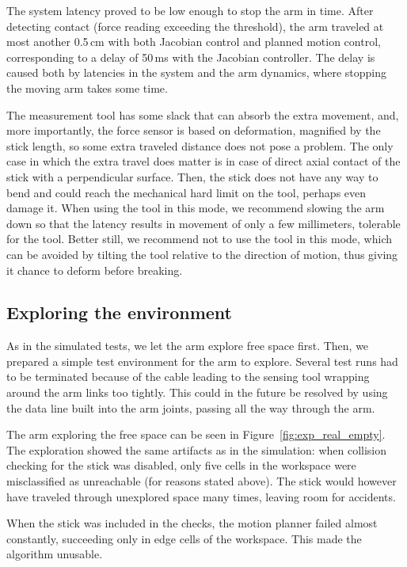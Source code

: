 \documentclass[buriama8_dp.tex]{subfiles}
\begin{document}
The system latency proved to be low enough to stop the arm in time. After detecting contact (force reading exceeding the threshold), the arm traveled at most another 0.5\,cm with both Jacobian control and planned motion control, corresponding to a delay of 50\,ms with the Jacobian controller. The delay is caused both by latencies in the system and the arm dynamics, where stopping the moving arm takes some time.

The measurement tool has some slack that can absorb the extra movement, and, more importantly, the force sensor is based on deformation, magnified by the stick length, so some extra traveled distance does not pose a problem. The only case in which the extra travel does matter is in case of direct axial contact of the stick with a perpendicular surface. Then, the stick does not have any way to bend and could reach the mechanical hard limit on the tool, perhaps even damage it. When using the tool in this mode, we recommend slowing the arm down so that the latency results in movement of only a few millimeters, tolerable for the tool. Better still, we recommend not to use the tool in this mode, which can be avoided by tilting the tool relative to the direction of motion, thus giving it chance to deform before breaking.



\subsection{Exploring the environment}
\label{subsec:expl_real}

As in the simulated tests, we let the arm explore free space first. Then, we prepared a simple test environment for the arm to explore. Several test runs had to be terminated because of the cable leading to the sensing tool wrapping around the arm links too tightly. This could in the future be resolved by using the data line built into the arm joints, passing all the way through the arm. 

The arm exploring the free space can be seen in Figure~\ref{fig:exp_real_empty}. The exploration showed the same artifacts as in the simulation: when collision checking for the stick was disabled, only five cells in the workspace were misclassified as unreachable (for reasons stated above). The stick would however have traveled through unexplored space many times, leaving room for accidents. 

When the stick was included in the checks, the motion planner failed almost constantly, succeeding only in edge cells of the workspace. This made the algorithm unusable.
\end{document}
